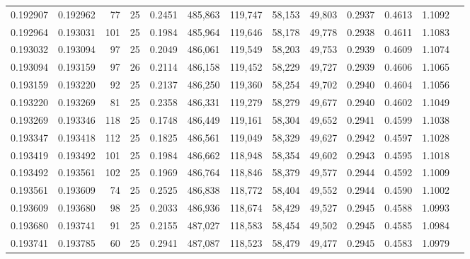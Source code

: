 \begin{tabular}{rrrrrrrrrrrrr}
0.192907 & 0.192962 &    77 &  25 &                                     0.2451 & 485,863 & 119,747 &  58,153 &  49,803 & 0.2937 & 0.4613 & 1.1092 \\
0.192964 & 0.193031 &   101 &  25 &                                     0.1984 & 485,964 & 119,646 &  58,178 &  49,778 & 0.2938 & 0.4611 & 1.1083 \\
0.193032 & 0.193094 &    97 &  25 &                                     0.2049 & 486,061 & 119,549 &  58,203 &  49,753 & 0.2939 & 0.4609 & 1.1074 \\
0.193094 & 0.193159 &    97 &  26 &                                     0.2114 & 486,158 & 119,452 &  58,229 &  49,727 & 0.2939 & 0.4606 & 1.1065 \\
0.193159 & 0.193220 &    92 &  25 &                                     0.2137 & 486,250 & 119,360 &  58,254 &  49,702 & 0.2940 & 0.4604 & 1.1056 \\
0.193220 & 0.193269 &    81 &  25 &                                     0.2358 & 486,331 & 119,279 &  58,279 &  49,677 & 0.2940 & 0.4602 & 1.1049 \\
0.193269 & 0.193346 &   118 &  25 &                                     0.1748 & 486,449 & 119,161 &  58,304 &  49,652 & 0.2941 & 0.4599 & 1.1038 \\
0.193347 & 0.193418 &   112 &  25 &                                     0.1825 & 486,561 & 119,049 &  58,329 &  49,627 & 0.2942 & 0.4597 & 1.1028 \\
0.193419 & 0.193492 &   101 &  25 &                                     0.1984 & 486,662 & 118,948 &  58,354 &  49,602 & 0.2943 & 0.4595 & 1.1018 \\
0.193492 & 0.193561 &   102 &  25 &                                     0.1969 & 486,764 & 118,846 &  58,379 &  49,577 & 0.2944 & 0.4592 & 1.1009 \\
0.193561 & 0.193609 &    74 &  25 &                                     0.2525 & 486,838 & 118,772 &  58,404 &  49,552 & 0.2944 & 0.4590 & 1.1002 \\
0.193609 & 0.193680 &    98 &  25 &                                     0.2033 & 486,936 & 118,674 &  58,429 &  49,527 & 0.2945 & 0.4588 & 1.0993 \\
0.193680 & 0.193741 &    91 &  25 &                                     0.2155 & 487,027 & 118,583 &  58,454 &  49,502 & 0.2945 & 0.4585 & 1.0984 \\
0.193741 & 0.193785 &    60 &  25 &                                     0.2941 & 487,087 & 118,523 &  58,479 &  49,477 & 0.2945 & 0.4583 & 1.0979 \\

\end{tabular}
